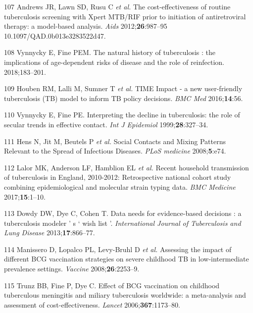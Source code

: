 \documentclass[11pt,twoside]{bristolthesis}
\begin{document}
  \leavevmode\hypertarget{ref-Andrews2012}{}%
  107 Andrews JR, Lawn SD, Rusu C \emph{et al.} The cost-effectiveness of routine tuberculosis screening with Xpert MTB/RIF prior to initiation of antiretroviral therapy: a model-based analysis. \emph{Aids} 2012;\textbf{26}:987--95 10.1097/QAD.0b013e3283522d47.
  
  \leavevmode\hypertarget{ref-Vynnycky1997}{}%
  108 Vynnycky E, Fine PEM. The natural history of tuberculosis : the implications of age-dependent risks of disease and the role of reinfection. 2018;183--201.
  
  \leavevmode\hypertarget{ref-Houben2016a}{}%
  109 Houben RM, Lalli M, Sumner T \emph{et al.} TIME Impact - a new user-friendly tuberculosis (TB) model to inform TB policy decisions. \emph{BMC Med} 2016;\textbf{14}:56.
  
  \leavevmode\hypertarget{ref-Vynnycky1999}{}%
  110 Vynnycky E, Fine PE. Interpreting the decline in tuberculosis: the role of secular trends in effective contact. \emph{Int J Epidemiol} 1999;\textbf{28}:327--34.
  
  \leavevmode\hypertarget{ref-Mossong2008}{}%
  111 Hens N, Jit M, Beutels P \emph{et al.} Social Contacts and Mixing Patterns Relevant to the Spread of Infectious Diseases. \emph{PLoS medicine} 2008;\textbf{5}:e74.
  
  \leavevmode\hypertarget{ref-Lalor2017}{}%
  112 Lalor MK, Anderson LF, Hamblion EL \emph{et al.} Recent household transmission of tuberculosis in England, 2010-2012: Retrospective national cohort study combining epidemiological and molecular strain typing data. \emph{BMC Medicine} 2017;\textbf{15}:1--10.
  
  \leavevmode\hypertarget{ref-Dowdy2012}{}%
  113 Dowdy DW, Dye C, Cohen T. Data needs for evidence-based decisions : a tuberculosis modeler ' s ` wish list '. \emph{International Journal of Tuberculosis and Lung Disease} 2013;\textbf{17}:866--77.
  
  \leavevmode\hypertarget{ref-Manissero2008a}{}%
  114 Manissero D, Lopalco PL, Levy-Bruhl D \emph{et al.} Assessing the impact of different BCG vaccination strategies on severe childhood TB in low-intermediate prevalence settings. \emph{Vaccine} 2008;\textbf{26}:2253--9.
  
  \leavevmode\hypertarget{ref-Trunz2006}{}%
  115 Trunz BB, Fine P, Dye C. Effect of BCG vaccination on childhood tuberculous meningitis and miliary tuberculosis worldwide: a meta-analysis and assessment of cost-effectiveness. \emph{Lancet} 2006;\textbf{367}:1173--80.
  
\end{document}
